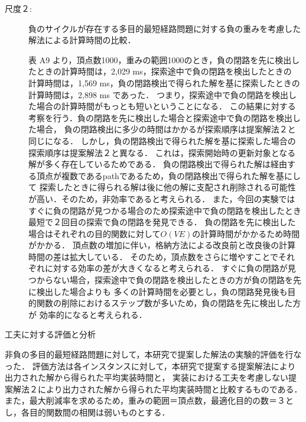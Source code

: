 \documentclass[12pt]{optlab-bachelor}
\begin{document}
\begin{description}
  \item[尺度２:]
  負のサイクルが存在する多目的最短経路問題に対する負の重みを考慮した解法による計算時間の比較．

  表 A9 より，頂点数1000，重みの範囲1000のとき，負の閉路を先に検出したときの計算時間は，2,029 ms，探索途中で負の閉路を検出したときの
  計算時間は，1,569 ms，負の閉路検出で得られた解を基に探索したときの計算時間は，2,898 ms であった．
  つまり，探索途中で負の閉路を検出した場合の計算時間がもっとも短いということになる．
  この結果に対する考察を行う．負の閉路を先に検出した場合と探索途中で負の閉路を検出した場合，
  負の閉路検出に多少の時間はかかるが探索順序は提案解法２と同じになる．
  しかし，負の閉路検出で得られた解を基に探索した場合の探索順序は提案解法２と異なる．
  これは，探索開始時の更新対象となる解が多く存在しているためである．
  負の閉路検出で得られた解は経由する頂点が複数であるpathであるため，負の閉路検出で得られた解を基にして
  探索したときに得られる解は後に他の解に支配され削除される可能性が高い．そのため，非効率であると考えられる．
  また，今回の実験ではすぐに負の閉路が見つかる場合のため探索途中で負の閉路を検出したとき最短で２回目の探索で負の閉路を発見できる．
  負の閉路を先に検出した場合はそれぞれの目的関数に対して$O(VE)$の計算時間がかかるため時間がかかる．
  頂点数の増加に伴い，格納方法による改良前と改良後の計算時間の差は拡大している．
  そのため，頂点数をさらに増やすことでそれぞれに対する効率の差が大きくなると考えられる．
  すぐに負の閉路が見つからない場合，探索途中で負の閉路を検出したときの方が負の閉路を先に検出した場合よりも
  多くの計算時間を必要とし，負の閉路発見後も目的関数の削除におけるステップ数が多いため，負の閉路を先に検出した方が
  効率的になると考えられる．

\end{description}

\begin{description}
  \item[工夫に対する評価と分析]
\end{description}

非負の多目的最短経路問題に対して，本研究で提案した解法の実験的評価を行なった．
評価方法は各インスタンスに対して，本研究で提案する提案解法により出力された解から得られた平均実装時間と，
実装における工夫を考慮しない提案解法２により出力された解から得られた平均実装時間と比較するものである．
また，最大削減率を求めるため，重みの範囲＝頂点数，最適化目的の数＝３とし，各目的関数間の相関は弱いものとする．
\end{document}

